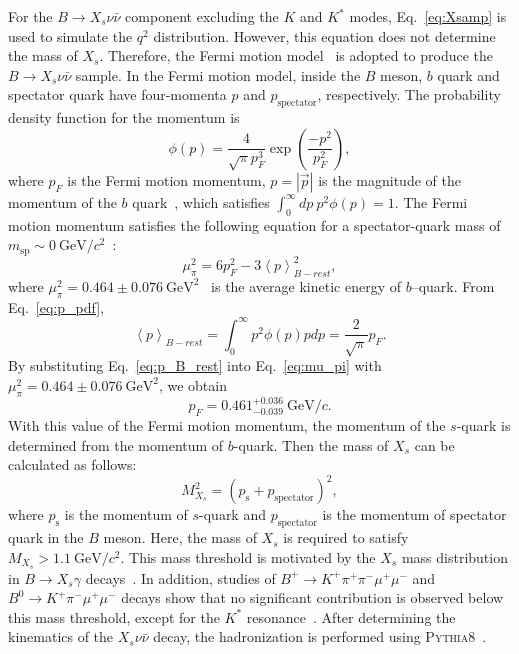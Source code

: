 For the $B\to X_s\nu\bar{\nu}$ component excluding the $K$ and $K^{*}$ modes, Eq.~\ref{eq:Xsamp} is used to simulate the $q^{2}$ distribution. 
However, this equation does not determine the mass of $X_{s}$.
Therefore, the Fermi motion model~\cite{Ali:1996bm} is adopted to produce the $B\rightarrow X_{s} \nu \bar{\nu}$ sample.
In the Fermi motion model, inside the $B$ meson, $b$ quark and spectator quark have four-momenta $p$ and $p_{\textrm{spectator}}$, respectively.
The probability density function for the momentum is
\begin{equation}
  \label{eq:p_pdf}
  \phi(p) = \frac{4}{\sqrt{\pi} p_{F}^{3}} \exp(\frac{-p^2}{p_{F}^{2}}),
\end{equation}
where $p_{F}$ is the Fermi motion momentum, $p = \left| \vec{p} \right|$ is the magnitude of the momentum of the $b$ quark~\cite{Ali:1996bm}, which satisfies $\int_{0}^{\infty}dp~p^{2} \phi(p) = 1$.
The Fermi motion momentum satisfies the following equation for a spectator-quark mass of $m_{\mathrm{sp}}\sim0~\mathrm{GeV}/c^2$~\cite{Kim:1998wx}:
\begin{equation}
  \label{eq:mu_pi}
  \mu_{\pi}^{2}=6p_{F}^{2}-3\left<p \right>^{2}_{B-rest},
\end{equation}
where $\mu_{\pi}^{2}=0.464\pm0.076~\textrm{GeV}^{2}$~\cite{HFLAV:2022pwe} is the average kinetic energy of $b$–quark.
From Eq.~\ref{eq:p_pdf},
\begin{equation}
  \label{eq:p_B_rest}
  \left<p \right>_{B-rest} = \int^{\infty}_{0}p^{2} \phi(p) p dp = \frac{2}{\sqrt{\pi}} p_{F}.
\end{equation}
By substituting Eq.~\ref{eq:p_B_rest} into Eq.~\ref{eq:mu_pi} with $\mu_{\pi}^{2}=0.464\pm0.076~\textrm{GeV}^{2}$, we obtain
\begin{equation}
  \label{eq:pf}
  p_{F} = 0.461^{+0.036}_{-0.039}~\textrm{GeV}/c.
\end{equation}
With this value of the Fermi motion momentum, the momentum of the $s$-quark is determined from the momentum of $b$-quark.
Then the mass of $X_{s}$ can be calculated as follows:
\begin{equation}
  M_{X_{s}}^{2} = \left( p_{\textrm{s}} + p_{\textrm{spectator}}  \right)^{2},
\end{equation}
where $p_{\textrm{s}}$ is the momentum of $s$-quark and $p_{\textrm{spectator}}$ is the momentum of spectator quark in the $B$ meson.
Here, the mass of $X_{s}$ is required to satisfy $M_{X_{s}} > 1.1~\textrm{GeV}/c^{2}$.
This mass threshold is motivated by the $X_{s}$ mass distribution in $B \rightarrow X_s\gamma$ decays~\cite{Belle:2014nmp}.
In addition, studies of $B^{+} \rightarrow K^{+}\pi^{+}\pi^{-}\mu^{+}\mu^{-}$ and $B^{0} \rightarrow K^{+}\pi^{-}\mu^{+}\mu^{-}$ decays show that no significant contribution is observed below this mass threshold, except for the $K^{*}$ resonance~\cite{LHCb:2016ykl,LHCb:2014osj}.
After determining the kinematics of the $X_{s}\nu \bar{\nu}$ decay, the hadronization is performed using \textsc{Pythia8}~\cite{Sjostrand:2014zea}.

